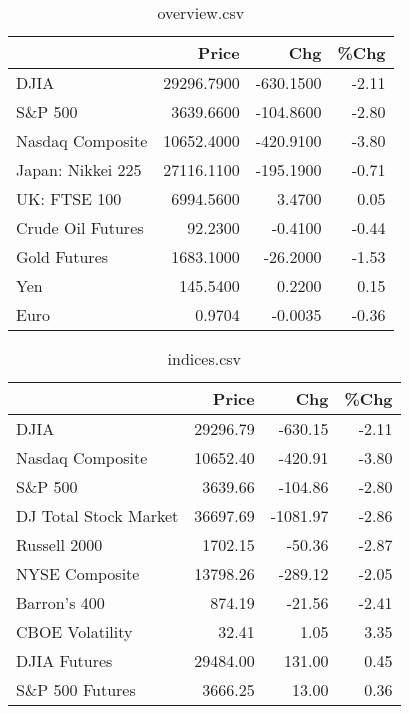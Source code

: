 \documentclass{article}%
\begin{document}
\begin{table}[htbp]%
\caption{overview.csv}%
\centering%
\begin{adjustbox}{width=1\textwidth}%
\begin{tabular}{lrrr}
\toprule
                  &      Price &       Chg &  \%Chg \\
\midrule
             DJIA & 29296.7900 & -630.1500 & -2.11 \\
          S\&P 500 &  3639.6600 & -104.8600 & -2.80 \\
 Nasdaq Composite & 10652.4000 & -420.9100 & -3.80 \\
Japan: Nikkei 225 & 27116.1100 & -195.1900 & -0.71 \\
     UK: FTSE 100 &  6994.5600 &    3.4700 &  0.05 \\
Crude Oil Futures &    92.2300 &   -0.4100 & -0.44 \\
     Gold Futures &  1683.1000 &  -26.2000 & -1.53 \\
              Yen &   145.5400 &    0.2200 &  0.15 \\
             Euro &     0.9704 &   -0.0035 & -0.36 \\
\bottomrule
\end{tabular}
%
\end{adjustbox}%
\end{table}

%


\begin{table}[htbp]%
\caption{indices.csv}%
\centering%
\begin{adjustbox}{width=1\textwidth}%
\begin{tabular}{lrrr}
\toprule
                      &    Price &      Chg &  \%Chg \\
\midrule
                 DJIA & 29296.79 &  -630.15 & -2.11 \\
     Nasdaq Composite & 10652.40 &  -420.91 & -3.80 \\
              S\&P 500 &  3639.66 &  -104.86 & -2.80 \\
DJ Total Stock Market & 36697.69 & -1081.97 & -2.86 \\
         Russell 2000 &  1702.15 &   -50.36 & -2.87 \\
       NYSE Composite & 13798.26 &  -289.12 & -2.05 \\
         Barron's 400 &   874.19 &   -21.56 & -2.41 \\
      CBOE Volatility &    32.41 &     1.05 &  3.35 \\
         DJIA Futures & 29484.00 &   131.00 &  0.45 \\
      S\&P 500 Futures &  3666.25 &    13.00 &  0.36 \\
\bottomrule
\end{tabular}
%
\end{adjustbox}%
\end{table}
\end{document}
